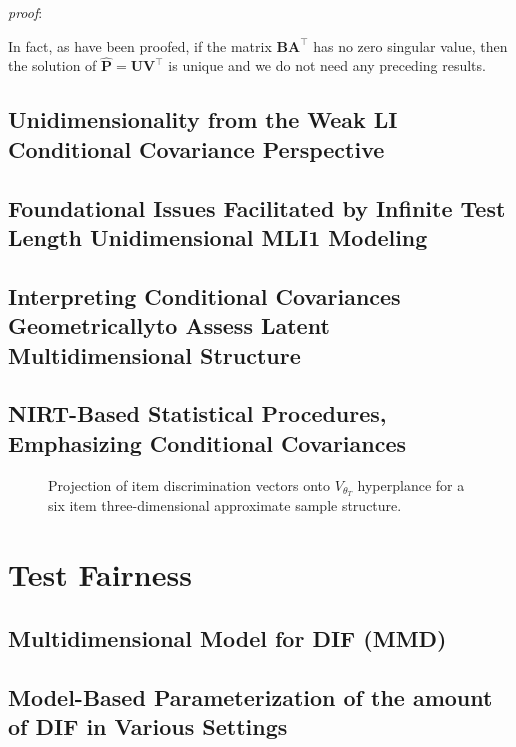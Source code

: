 \documentclass[titlepage,11pt,twoside]{article}
\begin{document}
\emph{proof}:

In fact, as have been proofed, if the matrix $\mathbf{\mathbf{B}\mathbf{A}^{\top}}$ has no zero singular value, then the solution of  
$\mathbf{\hat{P}} = \mathbf{U}\mathbf{V}^{\top}$ is unique and we do not need any preceding results.



\subsection{Unidimensionality from the Weak LI Conditional Covariance Perspective}


\subsection{Foundational Issues Facilitated by Infinite Test Length Unidimensional MLI1 Modeling}

\subsection{Interpreting Conditional Covariances Geometrically\break to Assess Latent Multidimensional Structure}


\subsection{NIRT-Based Statistical Procedures, Emphasizing Conditional Covariances}


\begin{figure}[h]
\caption{Projection of item discrimination vectors onto $V_{\theta_T}$ hyperplance for a six item three-dimensional approximate sample structure.}
\end{figure}



\section{Test Fairness}



\subsection{Multidimensional Model for DIF (MMD)}



\subsection{Model-Based Parameterization of the amount of DIF in Various Settings}
\end{document}
